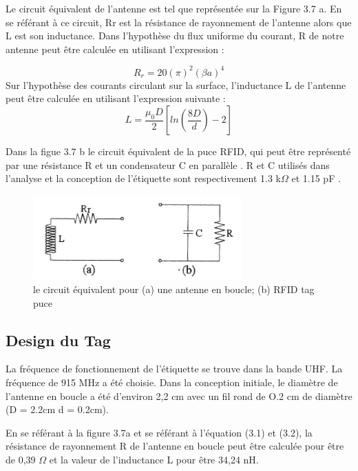 \documentclass[11pt, a4paper, twoside]{book}
\begin{document}
Le circuit équivalent de l'antenne est tel que représentée sur la Figure 3.7 a. En se référant à ce circuit, Rr est la résistance de rayonnement de l'antenne alors que L est son inductance. Dans l'hypothèse du flux uniforme du courant, R de notre antenne  peut être calculée en utilisant l'expression \cite{antennatheory}:

\begin{equation}
R_{r}  = 20 (\pi)^{2}(\beta a)^{4}
\end{equation}
Sur l'hypothèse des courants circulant sur la surface, l'inductance L de l'antenne peut être calculée en utilisant l'expression suivante \cite{antennatheory}:
\begin{equation}
L  = \frac{\mu_{0}D}{2}[ln(\frac{8D}{d})-2]
\end{equation}

Dans la figue 3.7 b le circuit équivalent de la puce RFID, qui peut être représenté par une résistance R et un condensateur  C en parallèle . R et C utilisés dans l'analyse et la conception de l'étiquette sont respectivement 1.3 k\(\Omega\) et 1.15 pF .

\begin{figure}[H]
\centering
\includegraphics[width=8cm]{eq}
\caption{le circuit équivalent pour (a) une antenne en boucle; (b) RFID tag puce}
\end{figure}

\subsection{Design du Tag}
La fréquence de fonctionnement de l'étiquette se trouve dans la bande UHF.
La fréquence de 915 MHz a été choisie. Dans la conception initiale, le diamètre de l'antenne en boucle a été d'environ 2,2 cm avec un fil rond de O.2 cm de diamètre  (D = 2.2cm d = 0.2cm).

En se référant à la figure 3.7a et se référant à l'équation (3.1) et (3.2), la résistance de rayonnement R de l'antenne en boucle peut être calculée pour être de 0,39  \(\Omega\) et la valeur de l'inductance L pour être  34,24 nH.\\
\end{document}
